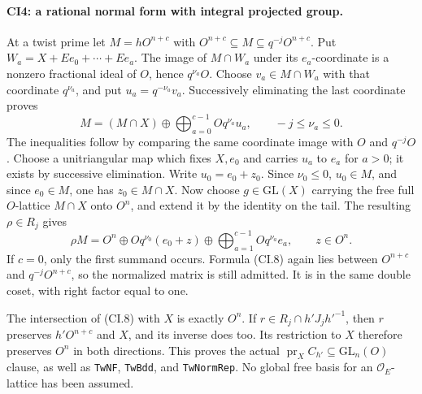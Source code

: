 \paragraph{CI4: a rational normal form with integral projected group.}
At a twist prime let $M=hO^{n+c}$ with
$O^{n+c}\subseteq M\subseteq q^{-j}O^{n+c}$. Put
$W_a=X+Ee_0+\cdots+Ee_a$. The image of $M\cap W_a$ under its
$e_a$-coordinate is a nonzero fractional ideal of $O$, hence
$q^{\nu_a}O$. Choose $v_a\in M\cap W_a$ with that coordinate
$q^{\nu_a}$, and put $u_a=q^{-\nu_a}v_a$.
Successively eliminating the last coordinate proves
\[
 M=(M\cap X)\oplus\bigoplus_{a=0}^{c-1}Oq^{\nu_a}u_a,
 \qquad -j\le\nu_a\le0.
 \tag{CI.7}
\]
The inequalities follow by comparing the same coordinate image
with $O$ and $q^{-j}O$. Choose a unitriangular map which fixes
$X,e_0$ and carries $u_a$ to $e_a$ for $a>0$; it exists by
successive elimination. Write $u_0=e_0+z_0$. Since
$\nu_0\le0$, $u_0\in M$, and since $e_0\in M$, one has
$z_0\in M\cap X$. Now choose $g\in\mathrm{GL}(X)$ carrying
the free full $O$-lattice $M\cap X$ onto $O^n$, and extend it
by the identity on the tail. The resulting $\rho\in R_j$ gives
\[
 \rho M=O^n\oplus Oq^{\nu_0}(e_0+z)
          \oplus\bigoplus_{a=1}^{c-1}Oq^{\nu_a}e_a,
 \qquad z\in O^n.
 \tag{CI.8}
\]
If $c=0$, only the first summand occurs. Formula (CI.8) again lies
between $O^{n+c}$ and $q^{-j}O^{n+c}$, so the normalized matrix
is still admitted. It is in the same double coset, with right
factor equal to one.

The intersection of (CI.8) with $X$ is exactly $O^n$.
If $r\in R_j\cap h'J_jh'^{-1}$, then $r$ preserves $h'O^{n+c}$
and $X$, and its inverse does too. Its restriction to $X$ therefore
preserves $O^n$ in both directions. This proves the actual
$\operatorname{pr}_X C_{h'}\subseteq\mathrm{GL}_n(O)$ clause,
as well as \texttt{TwNF}, \texttt{TwBdd}, and \texttt{TwNormRep}.
No global free basis for an $\mathcal O_E$-lattice has been assumed.

